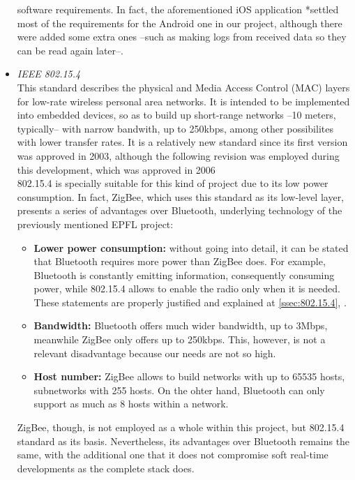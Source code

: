 \begin{itemize}
				software requirements. In fact, the aforementioned iOS application *settled most of the
				requirements for the Android one in our project, although there were added some extra ones --such as
				making logs from received data so they can be read again later--.\\
			\item \emph{IEEE 802.15.4}\\
				This standard describes the physical and Media Access Control (MAC) layers for low-rate wireless
				personal area networks. It is intended to be implemented into embedded devices, so as to build up
				short-range networks --10 meters, typically-- with narrow bandwith, up to 250kbps, among other
				possibilites with lower transfer rates. It is a relatively new standard since its first version
				was approved in 2003, although the following revision was employed during this development, which
				was approved in 2006 \cite{802.15.4}\\
				802.15.4 is specially suitable for this kind of project due to its low power consumption. In
				fact, ZigBee, which uses this standard as its low-level layer, presents a series of advantages
				over Bluetooth, underlying technology of the previously mentioned EPFL project:
				\begin{itemize}
					\item \textbf{Lower power consumption:} without going into detail, it can be stated that Bluetooth 
						requires more power than ZigBee does. For example, Bluetooth is constantly emitting information,
						consequently consuming power, while 802.15.4 allows to enable the radio only when it is needed.
						These statements are properly justified and explained at \autoref{ssec:802.15.4}, 
						.
					\item \textbf{Bandwidth:} Bluetooth offers much wider bandwidth, up to 3Mbps, meanwhile ZigBee 
						only offers up to 250kbps. This, however, is not a relevant disadvantage because our needs 
						are not so high.
					\item \textbf{Host number:} ZigBee allows to build networks with up to 65535 hosts, subnetworks 
						with 255 hosts. On the ohter hand, Bluetooth can only support as much as 8 hosts within a 
						network. 
				\end{itemize}
				ZigBee, though, is not employed as a whole within this project, but 802.15.4 standard as
				its basis. Nevertheless, its advantages over Bluetooth remains the same, with the additional one
				that it does not compromise soft real-time developments as the complete stack does.\\

\end{itemize}
